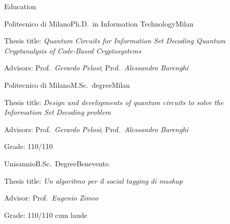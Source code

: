 \documentclass[
	a4paper, %
	10pt, %
]{tresume} %
\begin{document}
%
\begin{tSection}{Education}
  \begin{tSubsection}{Politecnico di Milano}{}{Ph.D.\ in Information Technology}{Milan}
  \item Thesis title: \emph{Quantum Circuits for Information Set Decoding\textendash{} Quantum Cryptanalysis of Code-Based Cryptosystems}
  \item Advisors: Prof.\ \emph{Gerardo Pelosi}; Prof.\ \emph{Alessandro
      Barenghi}
  \end{tSubsection}

  \begin{tSubsection}{Politecnico di Milano}{}{M.Sc.\ degree}{Milan}
  \item Thesis title: \emph{Design and developments of quantum circuits to solve the Information Set Decoding problem}
  \item Advisors: Prof.\ \emph{Gerardo Pelosi}; Prof.\ \emph{Alessandro
      Barenghi}
  \item Grade: 110/110
  \end{tSubsection}
  \begin{tSubsection}{Unisannio}{}{B.Sc.\ Degree}{Benevento}
  \item Thesis title: \textit{Un algoritmo per il social tagging di mashup}
  \item Advisor: Prof.\ \emph{Eugenio Zimeo}
  \item Grade: 110/110 cum laude
  \end{tSubsection}
\end{tSection}
\end{document}

